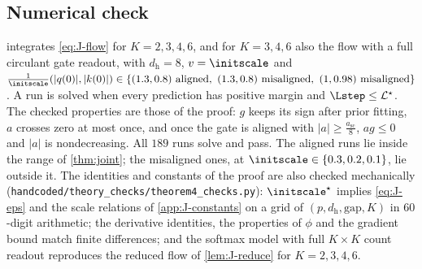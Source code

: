 \subsection{Numerical check}
\label{app:J-generalK}

 integrates \cref{eq:J-flow} for $K=2,3,4,6$, and for $K=3,4,6$ also the flow with a full circulant gate readout, with
$d_{\mathrm h}=8$, $v=\initscale$ and $\frac{1}{\initscale}(|q(0)|,|k(0)|)\in\{(1.3,0.8)\text{ aligned},\ (1.3,0.8)\text{ misaligned},\ (1,0.98)\text{ misaligned}\}$. A run is solved when every
prediction has positive margin and $\Lstep\le \mathcal L^\star$. The checked properties are those of the proof: $g$ keeps its sign after prior
fitting, $a$ crosses zero at most once, and once the gate is aligned with $|a|\ge\frac{a_{\mathrm{sc}}}{8}$, $ag\le0$ and $|a|$ is nondecreasing. All $189$ runs
solve and pass. The aligned runs lie inside the range of \cref{thm:joint}; the misaligned ones, at $\initscale\in\{0.3,0.2,0.1\}$, lie outside it.
The identities and constants of the proof are also checked mechanically (\texttt{handcoded/theory\_checks/theorem4\_checks.py}): $\initscale^\star$
implies \cref{eq:J-eps} and the scale relations of \cref{app:J-constants} on a grid of $(p,d_{\mathrm h},\mathrm{gap},K)$ in $60$-digit arithmetic; the
derivative identities, the properties of $\phi$ and the gradient bound match finite differences; and the softmax model with full
$K\times K$ count readout reproduces the reduced flow of \cref{lem:J-reduce} for $K=2,3,4,6$.

